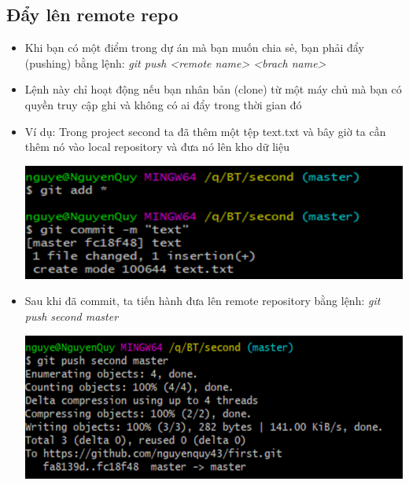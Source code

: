 \documentclass[12pt,a4paper]{report}
\begin{document}
\subsection{Đẩy lên remote repo}
\begin{itemize}
\item Khi bạn có một điểm trong dự án mà bạn muốn chia sẻ, bạn phải đẩy (pushing) bằng lệnh: {\it git push <remote name> <brach name> }
\item Lệnh này chỉ hoạt động nếu bạn nhân bản (clone) từ một máy chủ mà bạn có quyền truy cập ghi và không có ai đẩy trong thời gian đó
\item Ví dụ: Trong project second ta đã thêm một tệp text.txt và bây giờ ta cần thêm nó vào local repository và đưa nó lên kho dữ liệu

	\includegraphics[width=0.8\linewidth]{screenshot038}

	\label{fig:screenshot038}

\item Sau khi đã commit, ta tiến hành đưa lên remote repository bằng lệnh: \textit{git push second master}

	\includegraphics[width=0.8\linewidth]{screenshot039}

	\label{fig:screenshot039}
\end{itemize}	
\end{document}
